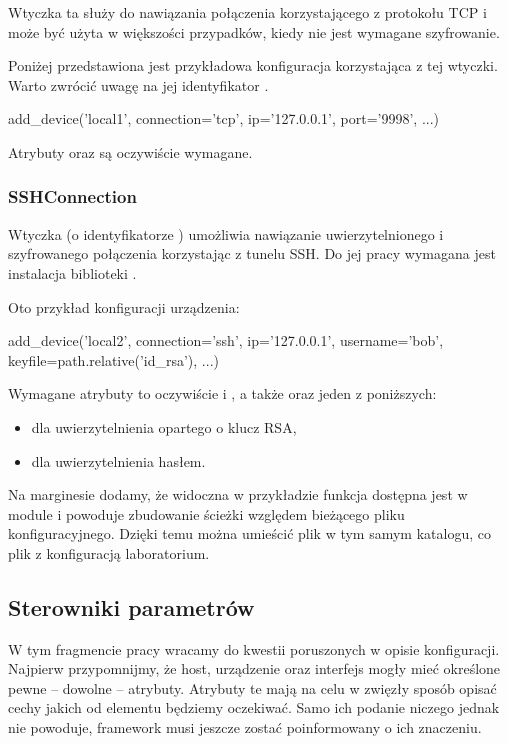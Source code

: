 \documentclass[00-praca-magisterska.tex]{subfiles}
\begin{document}
Wtyczka ta służy do nawiązania połączenia korzystającego z protokołu TCP i może
być użyta w większości przypadków, kiedy nie jest wymagane szyfrowanie.

Poniżej przedstawiona jest przykładowa konfiguracja korzystająca z tej wtyczki.
Warto zwrócić uwagę na jej identyfikator .

\begin{pythoncode}
  add_device('local1',
    connection='tcp',
    ip='127.0.0.1',
    port='9998',
    ...)
\end{pythoncode}

Atrybuty  oraz  są oczywiście wymagane.

\subsubsection{SSHConnection}

Wtyczka  (o identyfikatorze ) umożliwia
nawiązanie uwierzytelnionego i szyfrowanego połączenia korzystając z tunelu
SSH. Do jej pracy wymagana jest instalacja biblioteki .

Oto przykład konfiguracji urządzenia:

\begin{pythoncode}
  add_device('local2',
    connection='ssh',
    ip='127.0.0.1',
    username='bob',
    keyfile=path.relative('id_rsa'),
    ...)
\end{pythoncode}

Wymagane atrybuty to oczywiście  i , a także
 oraz jeden z poniższych:
\begin{itemize}
\item {} dla uwierzytelnienia opartego o klucz RSA,
\item {} dla uwierzytelnienia hasłem.
\end{itemize}

Na marginesie dodamy, że widoczna w przykładzie funkcja 
dostępna jest w module  i powoduje zbudowanie ścieżki względem
bieżącego pliku konfiguracyjnego. Dzięki temu można umieścić plik
 w tym samym katalogu, co plik z konfiguracją laboratorium.

\subsection{Sterowniki parametrów}

W tym fragmencie pracy wracamy do kwestii poruszonych w opisie konfiguracji.
Najpierw przypomnijmy, że host, urządzenie oraz interfejs mogły mieć określone
pewne -- dowolne -- atrybuty. Atrybuty te mają na celu w zwięzły sposób opisać
cechy jakich od elementu będziemy oczekiwać. Samo ich podanie niczego jednak nie
powoduje, framework musi jeszcze zostać poinformowany o ich znaczeniu.
\end{document}
